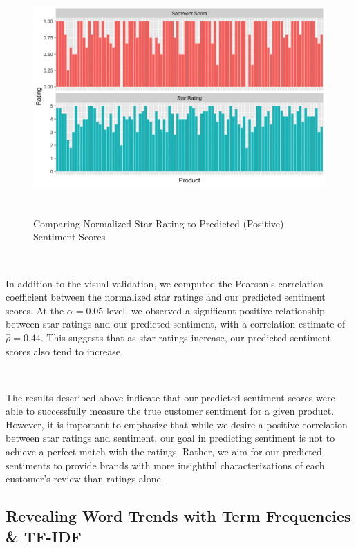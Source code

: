 \documentclass[10pt]{article}
\begin{document}
\begin{figure}[ht!]
    \centering
    \hspace*{-2em}
    \includegraphics[height=90mm, width=150mm]{sent-vs-star.png}
    \caption{Comparing Normalized Star Rating to Predicted (Positive) Sentiment Scores}
\end{figure}

\

In addition to the visual validation, we computed the Pearson's correlation coefficient between the normalized star ratings and our predicted sentiment scores. At the $\alpha = 0.05$ level, we observed a significant positive relationship between star ratings and our predicted sentiment, with a correlation estimate of $\hat \rho = 0.44$. This suggests that as star ratings increase, our predicted sentiment scores also tend to increase. 

\

The results described above indicate that our predicted sentiment scores were able to successfully measure the true customer sentiment for a given product. However, it is important to emphasize that while we desire a positive correlation between star ratings and sentiment, our goal in predicting sentiment is not to achieve a perfect match with the ratings. Rather, we aim for our predicted sentiments to provide brands with more insightful characterizations of each customer's review than ratings alone.



\subsection{Revealing Word Trends with Term Frequencies \& TF-IDF}
\end{document}
